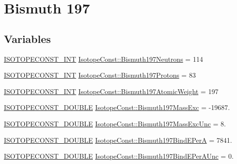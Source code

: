 \hypertarget{group___isotope_const-_bismuth-_bi197}{}\section{Bismuth 197}
\label{group___isotope_const-_bismuth-_bi197}
\subsection*{Variables}
\begin{DoxyCompactItemize}
\item 
\mbox{\hyperlink{group___isotope_const-_macros_ga5f18360b3e99483a35c32d789e62621c}{I\+S\+O\+T\+O\+P\+E\+C\+O\+N\+S\+T\+\_\+\+I\+NT}} \mbox{\hyperlink{group___isotope_const-_bismuth-_bi197_ga238ed89ef56392241da8a0a46a1e0366}{Isotope\+Const\+::\+Bismuth197\+Neutrons}} = 114
\item 
\mbox{\hyperlink{group___isotope_const-_macros_ga5f18360b3e99483a35c32d789e62621c}{I\+S\+O\+T\+O\+P\+E\+C\+O\+N\+S\+T\+\_\+\+I\+NT}} \mbox{\hyperlink{group___isotope_const-_bismuth-_bi197_gafbb0de473004a830813572794f72aee4}{Isotope\+Const\+::\+Bismuth197\+Protons}} = 83
\item 
\mbox{\hyperlink{group___isotope_const-_macros_ga5f18360b3e99483a35c32d789e62621c}{I\+S\+O\+T\+O\+P\+E\+C\+O\+N\+S\+T\+\_\+\+I\+NT}} \mbox{\hyperlink{group___isotope_const-_bismuth-_bi197_gaf71bfee282bfdc4373f3b9eb6eb3c2a5}{Isotope\+Const\+::\+Bismuth197\+Atomic\+Weight}} = 197
\item 
\mbox{\hyperlink{group___isotope_const-_macros_ga8f45a7272ce02c0b4c65c44636ed719a}{I\+S\+O\+T\+O\+P\+E\+C\+O\+N\+S\+T\+\_\+\+D\+O\+U\+B\+LE}} \mbox{\hyperlink{group___isotope_const-_bismuth-_bi197_gae4ae60c610d5c522bf2c95854b62862d}{Isotope\+Const\+::\+Bismuth197\+Mass\+Exc}} = -\/19687.
\item 
\mbox{\hyperlink{group___isotope_const-_macros_ga8f45a7272ce02c0b4c65c44636ed719a}{I\+S\+O\+T\+O\+P\+E\+C\+O\+N\+S\+T\+\_\+\+D\+O\+U\+B\+LE}} \mbox{\hyperlink{group___isotope_const-_bismuth-_bi197_ga8b1110154f1a7c740185ba84a0a55e56}{Isotope\+Const\+::\+Bismuth197\+Mass\+Exc\+Unc}} = 8.
\item 
\mbox{\hyperlink{group___isotope_const-_macros_ga8f45a7272ce02c0b4c65c44636ed719a}{I\+S\+O\+T\+O\+P\+E\+C\+O\+N\+S\+T\+\_\+\+D\+O\+U\+B\+LE}} \mbox{\hyperlink{group___isotope_const-_bismuth-_bi197_ga137e3b267cd4d0738cd38a0def14208a}{Isotope\+Const\+::\+Bismuth197\+Bind\+E\+PerA}} = 7841.
\item 
\mbox{\hyperlink{group___isotope_const-_macros_ga8f45a7272ce02c0b4c65c44636ed719a}{I\+S\+O\+T\+O\+P\+E\+C\+O\+N\+S\+T\+\_\+\+D\+O\+U\+B\+LE}} \mbox{\hyperlink{group___isotope_const-_bismuth-_bi197_ga1b702f16bf059f59d27ade0e5ffc90b8}{Isotope\+Const\+::\+Bismuth197\+Bind\+E\+Per\+A\+Unc}} = 0.

\end{DoxyCompactItemize}
